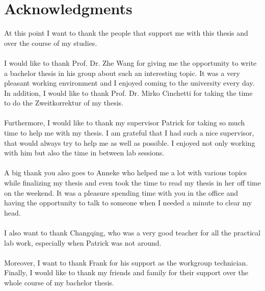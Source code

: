 \chapter*{Acknowledgments}
\thispagestyle{empty}
At this point I want to thank the people that support me with this thesis and over the course of my studies.
\\\\
I would like to thank Prof. Dr. Zhe Wang for giving me the opportunity to write a bachelor thesis in his group about such an interesting topic.
It was a very pleasant working environment and I enjoyed coming to the university every day.
\\
In addition, I would like to thank Prof. Dr. Mirko Cinchetti for taking the time to do the Zweitkorrektur of my thesis.
\\\\
Furthermore, I would like to thank my supervisor Patrick for taking so much time to help me with my thesis.
I am grateful that I had such a nice supervisor, that would always try to help me as well as possible.
I enjoyed not only working with him but also the time in between lab sessions.
\\\\
A big thank you also goes to Anneke who helped me a lot with various topics while finalizing my thesis and even took the time to read my thesis in her off time on the weekend.
It was a pleasure spending time with you in the office and having the opportunity to talk to someone when I needed a minute to clear my head.
\\\\
I also want to thank Changqing, who was a very good teacher for all the practical lab work, especially when Patrick was not around.
\\\\
Moreover, I want to thank Frank for his support as the workgroup technician.
Finally, I would like to thank my friends and family for their support over the whole course of my bachelor thesis.
\clearpage